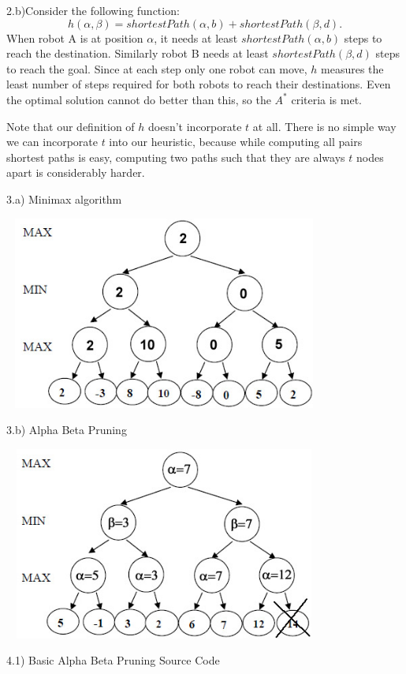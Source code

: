 \documentclass[11pt]{article}
\begin{document}
2.b)Consider the following function:
\[ h(\alpha,\beta) = shortestPath(\alpha,b) + shortestPath(\beta,d). \]
When robot A is at position $\alpha$, it needs at least $shortestPath(\alpha,b)$
steps to reach the destination. Similarly robot B needs at least $shortestPath(\beta,d)$
steps to reach the goal. Since at each step only one robot can move, $h$ measures
the least number of steps required for both robots to reach their destinations.
Even the optimal solution cannot do better than this, so the $A^*$ criteria is met.

Note that our definition of $h$ doesn't incorporate $t$ at all. There is no simple
way we can incorporate $t$ into our heuristic, because while computing all pairs
shortest paths is easy, computing two paths such that they are always $t$ nodes 
apart is considerably harder.

\newpage

3.a) Minimax algorithm

{\center \includegraphics[width=300pt,height=180pt]{q3a.jpg} }

3.b) Alpha Beta Pruning

{\center \includegraphics[width=300pt,height=180pt]{q3b.jpg} }

\newpage

4.1) Basic Alpha Beta Pruning Source Code
\end{document}
